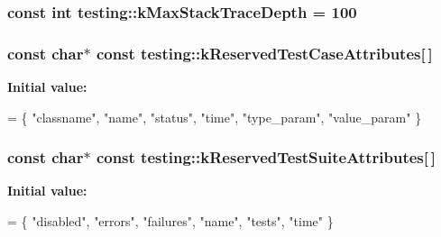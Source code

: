 {\subsubsection[{\texorpdfstring{k\+Max\+Stack\+Trace\+Depth}{kMaxStackTraceDepth}}]{\setlength{\rightskip}{0pt plus 5cm}const int testing\+::k\+Max\+Stack\+Trace\+Depth = 100}\hypertarget{namespacetesting_ae605f2ccac04616bb7812ca72e517082}{}\label{namespacetesting_ae605f2ccac04616bb7812ca72e517082}
\subsubsection[{\texorpdfstring{k\+Reserved\+Test\+Case\+Attributes}{kReservedTestCaseAttributes}}]{\setlength{\rightskip}{0pt plus 5cm}const char$\ast$ const testing\+::k\+Reserved\+Test\+Case\+Attributes\mbox{[}$\,$\mbox{]}\hspace{0.3cm}{\ttfamily [static]}}\hypertarget{namespacetesting_ae9689f28cd859736f734623b26c93d88}{}\label{namespacetesting_ae9689f28cd859736f734623b26c93d88}
{\bfseries Initial value\+:}
\begin{DoxyCode}
= \{
  \textcolor{stringliteral}{"classname"},
  \textcolor{stringliteral}{"name"},
  \textcolor{stringliteral}{"status"},
  \textcolor{stringliteral}{"time"},
  \textcolor{stringliteral}{"type\_param"},
  \textcolor{stringliteral}{"value\_param"}
\}
\end{DoxyCode}
\subsubsection[{\texorpdfstring{k\+Reserved\+Test\+Suite\+Attributes}{kReservedTestSuiteAttributes}}]{\setlength{\rightskip}{0pt plus 5cm}const char$\ast$ const testing\+::k\+Reserved\+Test\+Suite\+Attributes\mbox{[}$\,$\mbox{]}\hspace{0.3cm}{\ttfamily [static]}}\hypertarget{namespacetesting_af44b2969928d37e9081145760f21e79a}{}\label{namespacetesting_af44b2969928d37e9081145760f21e79a}
{\bfseries Initial value\+:}
\begin{DoxyCode}
= \{
  \textcolor{stringliteral}{"disabled"},
  \textcolor{stringliteral}{"errors"},
  \textcolor{stringliteral}{"failures"},
  \textcolor{stringliteral}{"name"},
  \textcolor{stringliteral}{"tests"},
  \textcolor{stringliteral}{"time"}
\}
\end{DoxyCode}
}
